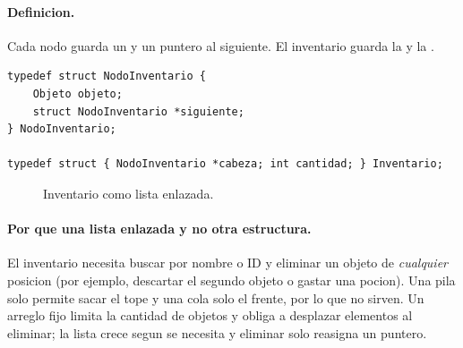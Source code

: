 \documentclass[11pt,a4paper]{article}
\newcommand{\fn}[1]{\texttt{\detokenize{#1}}}
\begin{document}
\paragraph{Definicion.}
Cada nodo guarda un \fn{Objeto} y un puntero al siguiente. El inventario guarda la
\fn{cabeza} y la \fn{cantidad}.

\begin{lstlisting}
typedef struct NodoInventario {
    Objeto objeto;
    struct NodoInventario *siguiente;
} NodoInventario;

typedef struct { NodoInventario *cabeza; int cantidad; } Inventario;
\end{lstlisting}

\begin{figure}[h]
\centering
{}
\caption{Inventario como lista enlazada.}
\end{figure}

\paragraph{Por que una lista enlazada y no otra estructura.}
El inventario necesita buscar por nombre o ID y eliminar un objeto de
\emph{cualquier} posicion (por ejemplo, descartar el segundo objeto o gastar una
pocion). Una pila solo permite sacar el tope y una cola solo el frente, por lo
que no sirven. Un arreglo fijo limita la cantidad de objetos y obliga a
desplazar elementos al eliminar; la lista crece segun se necesita y eliminar
solo reasigna un puntero.
\end{document}
